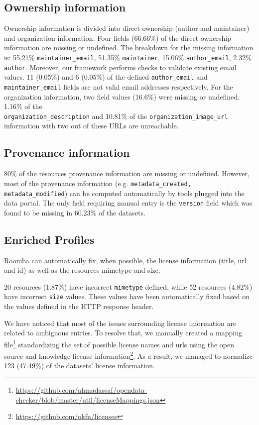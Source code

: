 \documentclass[runningheads,a4paper]{../../Tools/LaTEX/llncs}
\begin{document}
\subsection{Ownership information}
Ownership information is divided into direct ownership (author and maintainer) and organization information. Four fields (66.66\%) of the direct ownership information are missing or undefined. The breakdown for the missing information is: 55.21\% \texttt{maintainer\_email}, 51.35\% \texttt{maintainer}, 15.06\% \texttt{author\_email}, 2.32\% \texttt{author}. Moreover, our framework performs checks to validate existing email values. 11 (0.05\%) and 6 (0.05\%) of the defined \texttt{author\_email} and \texttt{maintainer\_email} fields are not valid email addresses respectively. For the organization information, two field values (16.6\%) were missing or undefined. 1.16\% of the \\\texttt{organization\_description} and 10.81\% of the \texttt{organization\-\_image\_url} information with two out of these URLs are unreachable.

\subsection{Provenance information}
80\% of the resources provenance information are missing or undefined. However, most of the provenance information (e.g. \texttt{metadata\_created, metadata\_modified}) can be computed automatically by tools plugged into the data portal. The only field requiring manual entry is the \texttt{version} field which was found to be missing in 60.23\% of the datasets.

\subsection{Enriched Profiles}
Roomba can automatically fix, when possible, the license information (title, url and id) as well as the resources mimetype and size.

20 resources (1.87\%) have incorrect \texttt{mimetype} defined, while 52 resources (4.82\%) have incorrect \texttt{size} values. These values have been automatically fixed based on the values defined in the HTTP response header.

We have noticed that most of the issues surrounding license information are related to ambiguous entries. To resolve that, we manually created a mapping file\footnote{\url{https://github.com/ahmadassaf/opendata-checker/blob/master/util/licenseMappings.json}} standardizing the set of possible license names and urls using the open source and knowledge license information\footnote{\url{https://github.com/okfn/licenses}}. As a result, we managed to normalize 123 (47.49\%) of the datasets' license information.
\end{document}
